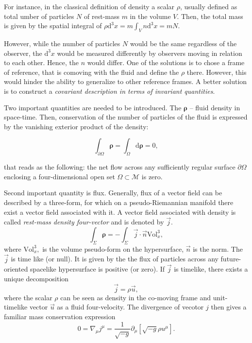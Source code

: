 \documentclass[11pt,a4paper,headinclude=true,DIV=14,BCOR=8mm,chapterprefix,listof=totoc,twoside,openright,abstracton]{scrbook}
\begin{document}
For instance, in the classical definition of density a scalar $\rho$, usually defined as total umber of particles $N$ of rest-mass $m$ in the volume $V$. Then, the total mass is given by the spatial integral of $\rho \text{d}^3x = m\int_V n \text{d}^3 x = mN$. 

However, while the number of particles $N$ would be the same regardless of the observer, the $\text{d}^3x$ would be measured differently by observers moving in relation to each other. Hence, the $n$ would differ. One of the solutions is to chose a frame of reference, that is comoving with the fluid and define the $\rho$ there. However, this would hinder the ability to generalize to other reference frames.
A better solution is to construct a \textit{covariant description in terms of invariant quantities}.

Two important quantities are needed to be introduced. The $\boldsymbol{\rho}$ -- fluid density in space-time. Then, conservation of the number of particles of the fluid is expressed by the vanishing exterior product of the density: 

\begin{equation}
    \int_{\partial\Omega} \boldsymbol{\rho} = \int_{\Omega}\text{d}\boldsymbol{\rho} = 0,
\end{equation}

that reads as the following: the net flow across any sufficiently regular surface $\partial\Omega$ enclosing a four-dimensional open set $\Omega\subset\mathcal{M}$ is zero.

Second important quantity is flux. Generally, flux of a vector field can be described by a three-form, for which on a pseudo-Riemannian manifold there exist a vector field associated with it.
A vector field associated with density is called \textit{rest-mass density four-vector} and is denoted by $\vec{j}$.
\begin{equation}
    \int_{\Sigma} \boldsymbol{\rho} = - \int_{\Sigma}\vec{j}\cdot\vec{n}\text{Vol}_x ^3,
\end{equation}
where $\text{Vol}_x ^3,$ is the volume pseudo-form on the hypersurface, $\vec{n}$ is the norm.
The $\vec{j}$ is time like (or null). It is given by the the flux of particles across any future-oriented spacelike hypersurface is positive (or zero). 
If $\vec{j}$ is timelike, there exists a unique decomposition 
\begin{equation}
    \vec{j} = \rho \vec{u},
    \label{eq:theory:defofjandu}
\end{equation}
where the scalar $\rho$ can be seen as density in the co-moving frame and unit-timelike vector $\vec{u}$ as a fluid four-velocity.
The divergence of vecotor $j$ then gives a familiar mass conservation expression
\begin{equation}
    0 = \nabla_{\mu}j^{\mu} = \frac{1}{\sqrt{-g}}\partial_{\mu}[\sqrt{-g}\rho u^{\mu}].
    \label{eq:theory:nablamu_jmu}
\end{equation}
\end{document}
